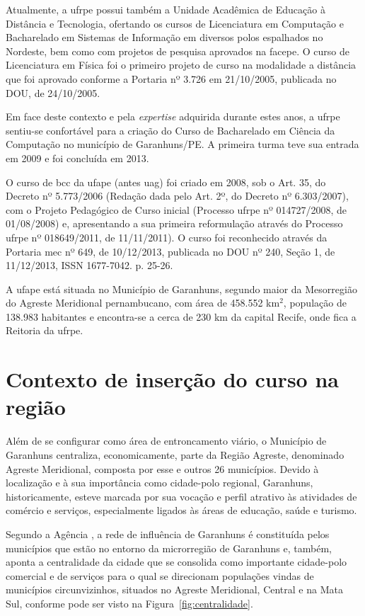 \documentclass[
	12pt,				%
	openright,			%
  oneside,     %
	a4paper,			%
 hyphens,
	chapter=TITLE,		%
	english,			%
	french,				%
	spanish,			%
	brazil				%
	]{abntex2}
\begin{document}
Atualmente, a \acrshort{ufrpe} possui também a Unidade Acadêmica de Educação à Distância e Tecnologia, ofertando os cursos de Licenciatura em Computação e Bacharelado em Sistemas de Informação em diversos polos espalhados no Nordeste, bem como com projetos de pesquisa aprovados na \acrfull{facepe}. O curso de Licenciatura em Física foi o primeiro projeto de curso na modalidade a distância que foi aprovado conforme a Portaria nº 3.726 em 21/10/2005, publicada no DOU, de 24/10/2005.

Em face deste contexto e pela \textit{expertise} adquirida durante estes anos, a \acrshort{ufrpe} sentiu-se confortável para a criação do Curso de Bacharelado em Ciência da Computação no município de Garanhuns/PE. A primeira turma teve sua entrada em 2009 e foi concluída em 2013. 

O curso de \acrshort{bcc} da \acrshort{ufape} (antes \acrshort{uag}) foi criado em 2008, sob o Art. 35, do Decreto nº 5.773/2006 (Redação dada pelo Art. 2º, do Decreto nº 6.303/2007), com o Projeto Pedagógico de Curso inicial (Processo \acrshort{ufrpe} nº 014727/2008, de 01/08/2008) e, apresentando a sua primeira reformulação através do Processo \acrshort{ufrpe} nº 018649/2011, de 11/11/2011). O curso foi reconhecido através da Portaria \acrshort{mec} nº 649, de 10/12/2013, publicada no DOU nº 240, Seção 1, de 11/12/2013, ISSN 1677-7042. p. 25-26.

A \acrshort{ufape} está situada no Município de Garanhuns, segundo maior da Mesorregião do Agreste Meridional pernambucano, com área de 458.552 km$^2$, população de 138.983 habitantes \cite{ibge2018} e encontra-se a cerca de 230 km da capital Recife, onde fica a Reitoria da \acrshort{ufrpe}.

\section{Contexto de inserção do curso na região}

Além de se configurar como área de entroncamento viário, o Município de Garanhuns centraliza, economicamente, parte da Região Agreste, denominado Agreste Meridional, composta por esse e outros 26 municípios. Devido à  localização  e  à  sua  importância como cidade-polo regional, Garanhuns, historicamente, esteve marcada por sua vocação e perfil atrativo às atividades de comércio e serviços, especialmente ligados às áreas de educação, saúde e turismo.

Segundo a Agência \cite{fidem2017agencia}, a rede de influência de Garanhuns é constituída pelos municípios que estão no entorno da microrregião de Garanhuns e, também, aponta a centralidade da cidade que se consolida como importante cidade-polo comercial e de serviços para o qual se direcionam populações vindas de municípios circunvizinhos, situados no Agreste Meridional, Central e na Mata Sul, conforme pode ser visto na Figura~\ref{fig:centralidade}.
\end{document}
